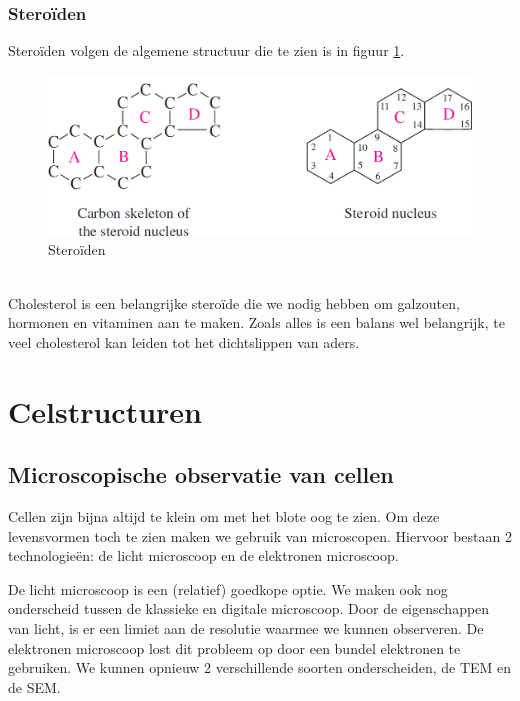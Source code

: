 \documentclass[a4paper,kul]{kulakarticle} %
\begin{document}
\subsubsection{Steroïden}
Steroïden volgen de algemene structuur die te zien is in figuur \ref{fig:steroidenstructuur}. 
\begin{figure}[h]
	\centering
	\includegraphics[width=0.5\linewidth]{steroidenstructuur}
	\caption[steroïden]{Steroïden}
	\label{fig:steroidenstructuur}
\end{figure}\\
Cholesterol is een belangrijke steroïde die we nodig hebben om galzouten, hormonen en vitaminen aan te maken. Zoals alles is een balans wel belangrijk, te veel cholesterol kan leiden tot het dichtslippen van aders. 

\section{Celstructuren}
\subsection{Microscopische observatie van cellen}
Cellen zijn bijna altijd te klein om met het blote oog te zien. Om deze levensvormen toch te zien maken we gebruik van microscopen. Hiervoor bestaan 2 technologieën: de licht microscoop en de elektronen microscoop. 

De licht microscoop is een (relatief) goedkope optie. We maken ook nog onderscheid tussen de klassieke en digitale microscoop. Door de eigenschappen van licht, is er een limiet aan de resolutie waarmee we kunnen observeren. De elektronen microscoop lost dit probleem op door een bundel elektronen te gebruiken. We kunnen opnieuw 2 verschillende soorten onderscheiden, de TEM en de SEM. 
\end{document}
